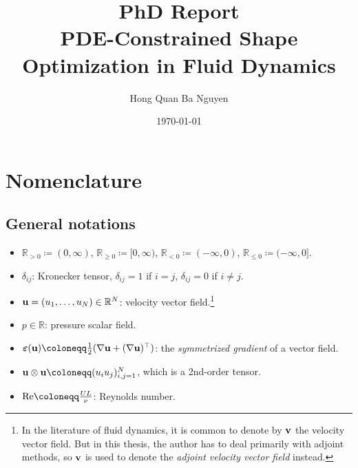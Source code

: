 \documentclass[oneside,11pt]{book}
\title{PhD Report\\PDE-Constrained Shape Optimization in Fluid Dynamics}
\author{Hong Quan Ba Nguyen}
\date{\today}
\numberwithin{equation}{section}
\begin{document}
\maketitle
\setcounter{secnumdepth}{6}
\tableofcontents


\chapter*{Nomenclature}

\section*{General notations}
\begin{itemize}
    \item $\mathbb{R}_{> 0}\coloneqq(0,\infty)$, $\mathbb{R}_{\ge 0}\coloneqq[0,\infty)$, $\mathbb{R}_{< 0}\coloneqq(-\infty,0)$, $\mathbb{R}_{\le 0}\coloneqq(-\infty,0]$.
    \item $\delta_{ij}$: Kronecker tensor, $\delta_{ij} = 1$ if $i = j$, $\delta_{ij} = 0$ if $i\ne j$.
    \item ${\bf u} = (u_1,\ldots,u_N)\in\mathbb{R}^N$: velocity vector field.\footnote{In the literature of fluid dynamics, it is common to denote by ${\bf v}$ the velocity vector field. But in this thesis, the author has to deal primarily with adjoint methods, so ${\bf v}$ is used to denote the \textit{adjoint velocity vector field} instead.}
    \item $p\in\mathbb{R}$: pressure scalar field.
    \item $\boldsymbol{\varepsilon}({\bf u})\coloneqq\frac{1}{2}(\nabla{\bf u} + (\nabla{\bf u})^\top)$: the \textit{symmetrized gradient} of a vector field.
    \item ${\bf u}\otimes{\bf u}\coloneqq(u_iu_j)_{i,j=1}^N$, which is a 2nd-order tensor.
    \item ${\rm Re}\coloneqq\frac{UL}{\nu}$: Reynolds number.
\end{itemize}
\end{document}

